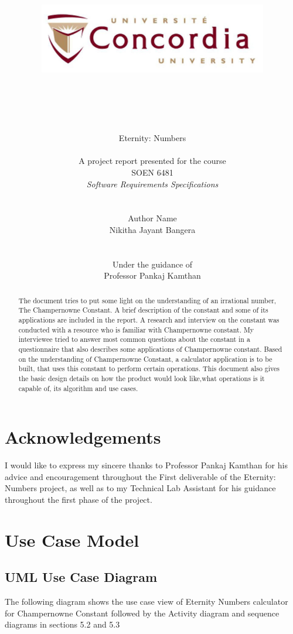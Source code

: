 \documentclass[12pt, a4paper]{report}
\date{}
\title{\includegraphics[width=10cm,height=5cm]{Con_Logo1.jpg}\\\\}
\author{
\LARGE{Eternity: Numbers}
\\\\
A project report presented for the course\\ 
SOEN 6481 \\\textit{Software Requirements Specifications}
\\ \\ 
\\ \Large{Author Name}
\\ Nikitha Jayant Bangera
\\\\ \\
Under the guidance of\\
Professor Pankaj Kamthan
}
\begin{document}
\thispagestyle{headings}
	\maketitle
{}

\thispagestyle{empty}
\chapter*{Acknowledgements}
I would like to express my sincere thanks to Professor Pankaj Kamthan for his advice and encouragement throughout the First deliverable of the Eternity: Numbers project, as well as to my Technical Lab Assistant for his guidance throughout the first phase of the project. 
\thispagestyle{empty}
\begin{abstract}
The document tries to put some light on the understanding of an irrational number, The Champernowne Constant. A brief description of the constant and some of its applications are included in the report. A research and interview on the constant was conducted with a resource who is familiar with Champernowne constant. My interviewee tried to answer most common questions about the constant in a questionnaire that also describes some applications of Champernowne constant. Based on the understanding of Champernowne Constant, a calculator application is to be built, that uses this constant to perform certain operations. This document also gives the basic design details on how the product would look like,what operations is it capable of, its algorithm and use cases.
\end{abstract}

\tableofcontents
\thispagestyle{plain}
\listoffigures
\listoftables

\chapter{Use Case Model}
\section{UML Use Case Diagram}
\quad The following diagram shows the use case view of Eternity Numbers calculator for Champernowne Constant followed by the Activity diagram and sequence diagrams in sections 5.2 and 5.3
\end{document}

